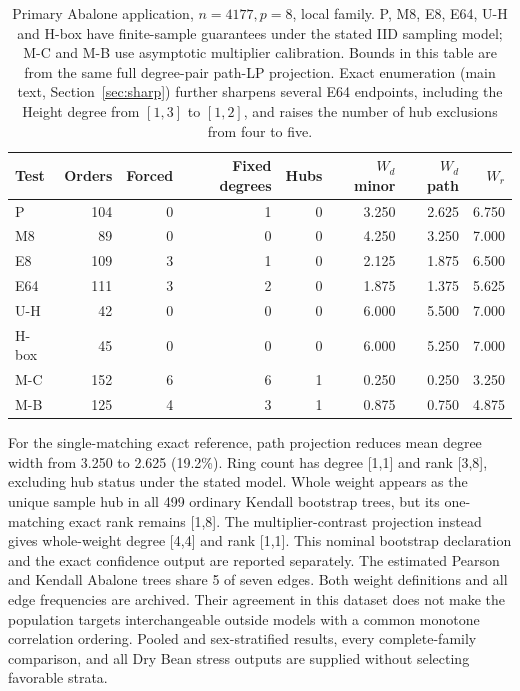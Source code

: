 \begin{table}[htbp]\centering\small
\setlength{\tabcolsep}{4pt}
\caption{Primary Abalone application, $n=4177,p=8$, local family. P, M8, E8, E64, U-H and H-box have finite-sample guarantees under the stated IID sampling model; M-C and M-B use asymptotic multiplier calibration. Bounds in this table are from the same full degree-pair path-LP projection. Exact enumeration (main text, Section~\ref{sec:sharp}) further sharpens several E64 endpoints, including the Height degree from $[1,3]$ to $[1,2]$, and raises the number of hub exclusions from four to five.}\label{tab:abalone}
\begin{lrbox}{\resultsbox}\begin{tabular}{lrrrrrrr}
\toprule
Test & Orders & Forced & Fixed degrees & Hubs & $W_d$ minor & $W_d$ path & $W_r$\\
\midrule
P & 104 & 0 & 1 & 0 & 3.250 & 2.625 & 6.750\\
M8 & 89 & 0 & 0 & 0 & 4.250 & 3.250 & 7.000\\
E8 & 109 & 3 & 1 & 0 & 2.125 & 1.875 & 6.500\\
E64 & 111 & 3 & 2 & 0 & 1.875 & 1.375 & 5.625\\
U-H & 42 & 0 & 0 & 0 & 6.000 & 5.500 & 7.000\\
H-box & 45 & 0 & 0 & 0 & 6.000 & 5.250 & 7.000\\
M-C & 152 & 6 & 6 & 1 & 0.250 & 0.250 & 3.250\\
M-B & 125 & 4 & 3 & 1 & 0.875 & 0.750 & 4.875\\
\bottomrule\end{tabular}\end{lrbox}\ifdim\wd\resultsbox>\linewidth\resizebox{\linewidth}{!}{\usebox{\resultsbox}}\else\usebox{\resultsbox}\fi\end{table}
For the single-matching exact reference, path projection reduces mean degree width from 3.250 to 2.625 (19.2\%). Ring count has degree [1,1] and rank [3,8], excluding hub status under the stated model. Whole weight appears as the unique sample hub in all 499 ordinary Kendall bootstrap trees, but its one-matching exact rank remains [1,8]. The multiplier-contrast projection instead gives whole-weight degree [4,4] and rank [1,1]. This nominal bootstrap declaration and the exact confidence output are reported separately.
The estimated Pearson and Kendall Abalone trees share 5 of seven edges. Both weight definitions and all edge frequencies are archived. Their agreement in this dataset does not make the population targets interchangeable outside models with a common monotone correlation ordering. Pooled and sex-stratified results, every complete-family comparison, and all Dry Bean stress outputs are supplied without selecting favorable strata.
